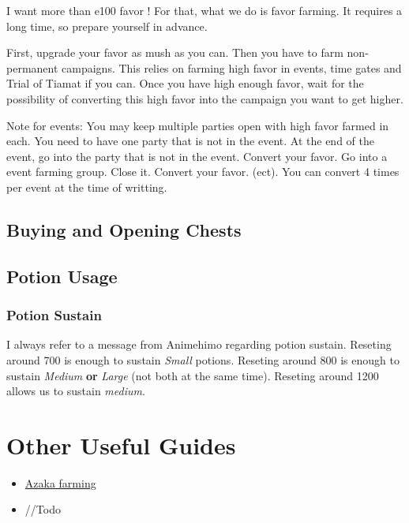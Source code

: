 \documentclass{article}
\begin{document}
I want more than e100 favor !
For that, what we do is favor farming.
It requires a long time, so prepare yourself in advance.

First, upgrade your favor as mush as you can.
Then you have to farm non-permanent campaigns.
This relies on farming high favor in events, time gates and Trial of Tiamat if you can.
Once you have high enough favor, wait for the possibility of converting this high favor into the campaign you want to get higher.

Note for events:
You may keep multiple parties open with high favor farmed in each.
You need to have one party that is not in the event.
At the end of the event, go into the party that is not in the event.
Convert your favor.
Go into a event farming group.
Close it.
Convert your favor.
(ect).
You can convert 4 times per event at the time of writting.





\subsection{Buying and Opening Chests}
\subsection{Potion Usage}

\subsubsection{Potion Sustain}
\label{sec:potionSustain}

I always refer to a message from Animehimo regarding potion sustain.
Reseting around 700 is enough to sustain \textit{Small} potions.
Reseting around 800 is enough to sustain \textit{Medium} \textbf{or} \textit{Large} (not both at the same time).
Reseting around 1200 allows us to sustain \textit{medium}.


\section{Other Useful Guides}

\begin{itemize}
\item \href{https://docs.google.com/document/d/1TT5g3BjKDreYQ3MutCRgeSRGYD8a7GrFfZ96bIllT7o/edit?usp=sharing}{Azaka farming}
\item //Todo
\end{itemize}
\end{document}

